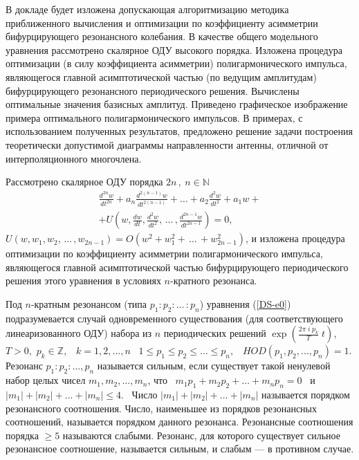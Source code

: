 




 В докладе будет изложена допускающая алгоритмизацию методика приближенного вычисления и оптимизации по коэффициенту асимметрии бифурцирующего резонансного колебания. В качестве общего модельного уравнения рассмотрено скалярное ОДУ высокого порядка. Изложена  процедура оптимизации (в силу коэффициента асимметрии) полигармонического импульса, являющегося главной асимптотической частью (по ведущим амплитудам) бифурцирующего резонансного периодического решения. Вычислены оптимальные значения базисных амплитуд. Приведено графическое изображение примера оптимального полигармонического импульсов. В примерах, с использованием полученных результатов, предложено решение задачи построения теоретически допустимой диаграммы направленности антенны, отличной от интерполяционного многочлена.


Рассмотрено скалярное ОДУ порядка
$2n\,, \ n\in \mathbb{N}$
{\small
\begin{multline}\label{DS-e0}
\frac{d^{2n}w}{dt^{2n}}+ a_n\frac{d^{2(n-1)}w}{dt^{2(n-1)}}+ \dots +
a_2\frac{d^2w}{dt^2}+a_1w +
\\+
U \left(w,\frac{dw}{dt},
\frac{d^2w}{dt^2},\, \dots\,, \frac{d^{2n-1}w}{dt^{2n-1}}\right)
= 0,
\end{multline}}
$U(w,w_1, w_2,\, \dots\,, w_{2n-1})=O(w^2 + w_1^2+\, \dots\,
+w_{2n-1}^2)$, и изложена процедура оптимизации по коэффициенту
асимметрии полигармонического импульса, являющегося главной
асимптотической частью бифурцирующего периодического решения этого
уравнения в условиях $n$-кратного резонанса.

Под $n$-кратным резонансом (типа $p_1:p_2: \dots \,:p_n$) уравнения
(\ref{DS-e0}) подразумевается случай одновременного существования
(для соответствующего линеаризованного ОДУ) набора из $n$
периодических решений $\exp(\frac{2\pi\; i \;p_k}{T}\;t)$, \ $T >
0,$ $p_k\in \mathbb{Z},$ \ $k=1,2,\dots ,n$ \ $1\leqslant p_1 \leqslant p_2
\leqslant\dots \leqslant p_n,$ \ $HOD(p_1,p_2, \dots , p_n)=1$. Резонанс
$p_1:p_2:\dots , p_n$ называется сильным, если существует такой
ненулевой набор целых чисел $m_1,m_2,\dots , m_n$, что \
$m_1p_1+m_2p_2+ \dots + m_np_n=0$ \ и \ $|m_1|+|m_2|+ \dots +
|m_n|\leqslant 4.$ \ Число $|m_1|+|m_2|+ \dots + |m_n|$ называется
порядком резонансного соотношения. Число, наименьшее из порядков
резонансных соотношений, называется порядком данного резонанса.
Резонансные соотношения порядка $\geqslant 5$ называются слабыми.
Резонанс, для которого существует сильное резонансное соотношение,
называется сильным, и слабым --- в противном случае.

